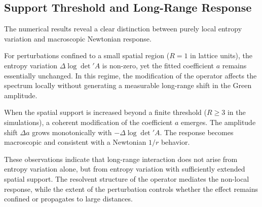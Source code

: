   \subsection{Support Threshold and Long-Range Response}

    The numerical results reveal a clear distinction between
    purely local entropy variation and macroscopic Newtonian response.

    For perturbations confined to a small spatial region
    ($R=1$ in lattice units), the entropy variation
    $\Delta \log \det{}' A$ is non-zero,
    yet the fitted coefficient $a$ remains essentially unchanged.
    In this regime, the modification of the operator affects
    the spectrum locally without generating a measurable
    long-range shift in the Green amplitude.

    When the spatial support is increased beyond a finite threshold
    ($R \ge 3$ in the simulations), a coherent modification of the
    coefficient $a$ emerges.
    The amplitude shift $\Delta a$ grows monotonically
    with $-\Delta \log \det{}' A$.
    The response becomes macroscopic and consistent with
    a Newtonian $1/r$ behavior.

    These observations indicate that long-range interaction
    does not arise from entropy variation alone,
    but from entropy variation with sufficiently extended
    spatial support.
    The resolvent structure of the operator mediates
    the non-local response, while the extent of the perturbation
    controls whether the effect remains confined or propagates
    to large distances.
